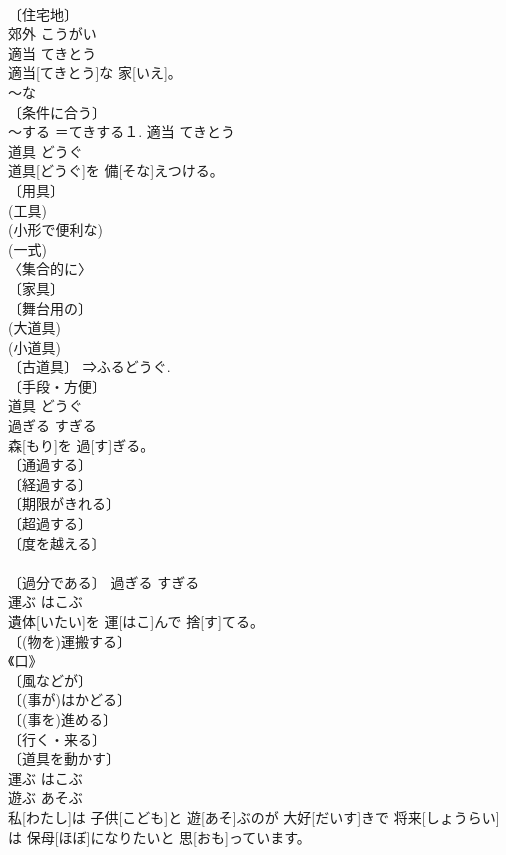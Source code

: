 \documentclass[8pt]{extreport}
\begin{document}
\begin{CJK}{UTF8}{min}
\\	〔住宅地〕 
\\	郊外	こうがい	
\\	適当	てきとう	
\\	適当[てきとう]な 家[いえ]。	
\\	～な 
\\	〔条件に合う〕 
\\	～する ＝てきする１.	適当	てきとう	
\\	道具	どうぐ	
\\	道具[どうぐ]を 備[そな]えつける。	
\\	〔用具〕 
\\	(工具) 
\\	(小形で便利な) 
\\	(一式) 
\\	〈集合的に〉 
\\	〔家具〕 
\\	〔舞台用の〕 
\\	(大道具) 
\\	(小道具) 
\\	〔古道具〕 ⇒ふるどうぐ. 
\\	〔手段・方便〕 
\\	道具	どうぐ	
\\	過ぎる	すぎる	
\\	森[もり]を 過[す]ぎる。	
\\	〔通過する〕 
\\	〔経過する〕 
\\	〔期限がきれる〕 
\\	〔超過する〕 
\\	〔度を越える〕 
\\	[⇒-すぎる] 
\\	〔過分である〕	過ぎる	すぎる	
\\	運ぶ	はこぶ	
\\	遺体[いたい]を 運[はこ]んで 捨[す]てる。	
\\	〔(物を)運搬する〕 
\\	《口》 
\\	〔風などが〕 
\\	〔(事が)はかどる〕 
\\	〔(事を)進める〕 
\\	〔行く・来る〕 
\\	〔道具を動かす〕 
\\	運ぶ	はこぶ	
\\	遊ぶ	あそぶ	
\\	私[わたし]は 子供[こども]と 遊[あそ]ぶのが 大好[だいす]きで 将来[しょうらい]は 保母[ほぼ]になりたいと 思[おも]っています。	

\end{CJK}
\end{document}
